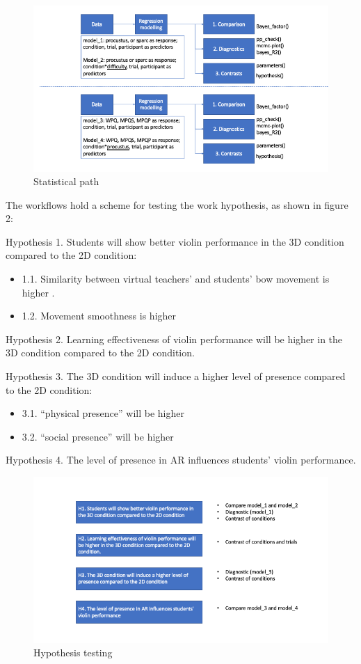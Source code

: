 \documentclass[
]{article}
\begin{document}
\begin{figure}
\centering
\includegraphics{FiguresPaper/StatisticPath1.png}
\caption{Statistical path}
\end{figure}

The workflows hold a scheme for testing the work hypothesis, as shown in
figure 2:

Hypothesis 1. Students will show better violin performance in the 3D
condition compared to the 2D condition:

\begin{itemize}
\item
  1.1. Similarity between virtual teachers' and students' bow movement
  is higher .
\item
  1.2. Movement smoothness is higher
\end{itemize}

Hypothesis 2. Learning effectiveness of violin performance will be
higher in the 3D condition compared to the 2D condition.

Hypothesis 3. The 3D condition will induce a higher level of presence
compared to the 2D condition:

\begin{itemize}
\item
  3.1. ``physical presence'' will be higher
\item
  3.2. ``social presence'' will be higher
\end{itemize}

Hypothesis 4. The level of presence in AR influences students' violin
performance.

\begin{figure}
\centering
\includegraphics{FiguresPaper/StatisticPath2.png}
\caption{Hypothesis testing}
\end{figure}
\end{document}
